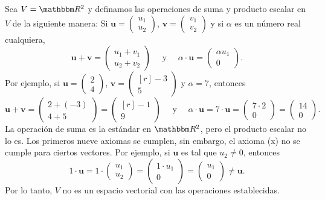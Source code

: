 \begin{examplebox}{}{}
    Sea $V = \RR[2]$ y definamos las operaciones de suma y producto escalar en $V$ de la siguiente manera: Si $\mathbf{u} = \begin{pmatrix}
        u_1 \\
        u_2
    \end{pmatrix}$, $\mathbf{v} = \begin{pmatrix}
        v_1 \\
        v_2
    \end{pmatrix}$ y si $\alpha$ es un número real cualquiera,
    $$\mathbf{u} + \mathbf{v} = \begin{pmatrix}
        u_1 + v_1 \\
        u_2 + v_2
    \end{pmatrix} \quad \text{ y } \quad \alpha \cdot \mathbf{u} = \begin{pmatrix}
        \alpha u_1 \\
        0
    \end{pmatrix}.$$
    Por ejemplo, si $\mathbf{u} = \begin{pmatrix}
        2 \\
        4
    \end{pmatrix}$, $\mathbf{v} = \begin{pmatrix*}[r]
        -3 \\
        5
    \end{pmatrix*}$ y $\alpha = 7$, entonces
    $$\mathbf{u} + \mathbf{v} = \begin{pmatrix}
        2 + (-3) \\
        4 + 5
    \end{pmatrix} = \begin{pmatrix*}[r]
        -1 \\
        9
    \end{pmatrix*} \quad \text{ y } \quad \alpha \cdot \mathbf{u} = 7 \cdot \mathbf{u} = \begin{pmatrix}
        7 \cdot 2 \\
        0
    \end{pmatrix} = \begin{pmatrix}
        14 \\ 
        0
    \end{pmatrix}.$$
    La operación de suma es la estándar en $\RR[2]$, pero el producto escalar no lo es. Los primeros nueve axiomas se cumplen, sin embargo, el axioma (x) no se cumple para ciertos vectores. Por ejemplo, si $\mathbf{u}$ es tal que $u_2 \neq 0$, entonces
    $$1 \cdot \mathbf{u} = 1 \cdot \begin{pmatrix}
        u_1 \\
        u_2
    \end{pmatrix} = \begin{pmatrix}
        1 \cdot u_1 \\
        0
    \end{pmatrix} = \begin{pmatrix}
        u_1 \\
        0
    \end{pmatrix} \neq \mathbf{u}.$$
    Por lo tanto, $V$ no es un espacio vectorial con las operaciones establecidas.
\end{examplebox}

